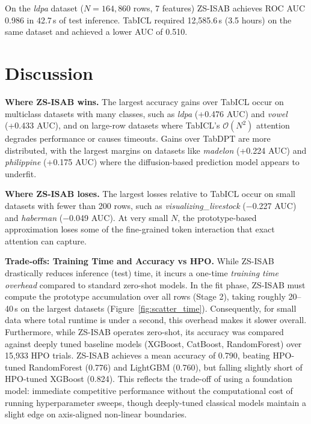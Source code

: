 \documentclass{article}
\begin{document}
On the \textit{ldpa} dataset ($N = 164{,}860$ rows, 7 features) ZS-ISAB achieves ROC AUC 0.986 in 42.7\,s of test inference. TabICL required 12{,}585.6\,s (3.5 hours) on the same dataset and achieved a lower AUC of 0.510.

\section{Discussion}

\textbf{Where ZS-ISAB wins.}
The largest accuracy gains over TabICL occur on multiclass datasets with many classes, such as \textit{ldpa} (+0.476 AUC) and \textit{vowel} (+0.433 AUC), and on large-row datasets where TabICL's $\mathcal{O}(N^2)$ attention degrades performance or causes timeouts. Gains over TabDPT are more distributed, with the largest margins on datasets like \textit{madelon} (+0.224 AUC) and \textit{philippine} (+0.175 AUC) where the diffusion-based prediction model appears to underfit.

\textbf{Where ZS-ISAB loses.}
The largest losses relative to TabICL occur on small datasets with fewer than 200 rows, such as \textit{visualizing\_livestock} ($-$0.227 AUC) and \textit{haberman} ($-$0.049 AUC). At very small $N$, the prototype-based approximation loses some of the fine-grained token interaction that exact attention can capture.

\textbf{Trade-offs: Training Time and Accuracy vs HPO.}
While ZS-ISAB drastically reduces inference (test) time, it incurs a one-time \emph{training time overhead} compared to standard zero-shot models. In the fit phase, ZS-ISAB must compute the prototype accumulation over all rows (Stage 2), taking roughly 20--40\,s on the largest datasets (Figure~\ref{fig:scatter_time}). Consequently, for small data where total runtime is under a second, this overhead makes it slower overall. 
Furthermore, while ZS-ISAB operates zero-shot, its accuracy was compared against deeply tuned baseline models (XGBoost, CatBoost, RandomForest) over 15,933 HPO trials. ZS-ISAB achieves a mean accuracy of 0.790, beating HPO-tuned RandomForest (0.776) and LightGBM (0.760), but falling slightly short of HPO-tuned XGBoost (0.824). This reflects the trade-off of using a foundation model: immediate competitive performance without the computational cost of running hyperparameter sweeps, though deeply-tuned classical models maintain a slight edge on axis-aligned non-linear boundaries.
\end{document}
